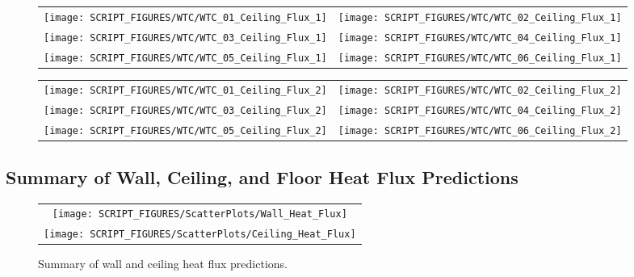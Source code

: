 \begin{figure}[p]
\begin{tabular*}{\textwidth}{l@{\extracolsep{\fill}}r}
\texttt{[image: SCRIPT\_FIGURES/WTC/WTC\_01\_Ceiling\_Flux\_1]} &
\texttt{[image: SCRIPT\_FIGURES/WTC/WTC\_02\_Ceiling\_Flux\_1]} \\
\texttt{[image: SCRIPT\_FIGURES/WTC/WTC\_03\_Ceiling\_Flux\_1]} &
\texttt{[image: SCRIPT\_FIGURES/WTC/WTC\_04\_Ceiling\_Flux\_1]} \\
\texttt{[image: SCRIPT\_FIGURES/WTC/WTC\_05\_Ceiling\_Flux\_1]} &
\texttt{[image: SCRIPT\_FIGURES/WTC/WTC\_06\_Ceiling\_Flux\_1]}
\end{tabular*}
\label{NIST_WTC_Ceiling_Flux_1}
\end{figure}

\begin{figure}[p]
\begin{tabular*}{\textwidth}{l@{\extracolsep{\fill}}r}
\texttt{[image: SCRIPT\_FIGURES/WTC/WTC\_01\_Ceiling\_Flux\_2]} &
\texttt{[image: SCRIPT\_FIGURES/WTC/WTC\_02\_Ceiling\_Flux\_2]} \\
\texttt{[image: SCRIPT\_FIGURES/WTC/WTC\_03\_Ceiling\_Flux\_2]} &
\texttt{[image: SCRIPT\_FIGURES/WTC/WTC\_04\_Ceiling\_Flux\_2]} \\
\texttt{[image: SCRIPT\_FIGURES/WTC/WTC\_05\_Ceiling\_Flux\_2]} &
\texttt{[image: SCRIPT\_FIGURES/WTC/WTC\_06\_Ceiling\_Flux\_2]}
\end{tabular*}
\label{NIST_WTC_Ceiling_Flux_2}
\end{figure}


\clearpage

\subsection{Summary of Wall, Ceiling, and Floor Heat Flux Predictions}

\begin{figure}[h!]
\begin{center}
\begin{tabular}{c}
\texttt{[image: SCRIPT\_FIGURES/ScatterPlots/Wall\_Heat\_Flux]} \\
\texttt{[image: SCRIPT\_FIGURES/ScatterPlots/Ceiling\_Heat\_Flux]}
\end{tabular}
\end{center}
\caption[Summary of wall and ceiling heat flux predictions]
{Summary of wall and ceiling heat flux predictions.}
\end{figure}

